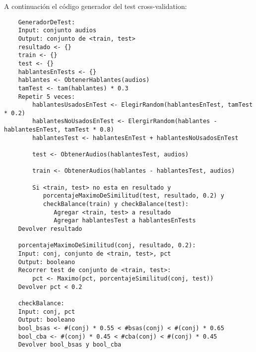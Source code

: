 A continuación el código generador del test cross-validation:
\begin{lstlisting}
    GeneradorDeTest:
    Input: conjunto audios
    Output: conjunto de <train, test>
    resultado <- {} 
    train <- {}
    test <- {}
    hablantesEnTests <- {}
    hablantes <- ObtenerHablantes(audios)
    tamTest <- tam(hablantes) * 0.3
    Repetir 5 veces:
        hablantesUsadosEnTest <- ElegirRandom(hablantesEnTest, tamTest * 0.2)
        hablantesNoUsadosEnTest <- ElergirRandom(hablantes - hablantesEnTest, tamTest * 0.8)
        hablantesTest <- hablantesEnTest + hablantesNoUsadosEnTest

        test <- ObtenerAudios(hablantesTest, audios)

        train <- ObtenerAudios(hablantes - hablantesTest, audios)

        Si <train, test> no esta en resultado y 
           porcentajeMaximoDeSimilitud(test, resultado, 0.2) y
           checkBalance(train) y checkBalance(test):
              Agregar <train, test> a resultado
              Agregar hablantesTest a hablantesEnTests
    Devolver resultado
    
    porcentajeMaximoDeSimilitud(conj, resultado, 0.2):
    Input: conj, conjunto de <train, test>, pct
    Output: booleano
    Recorrer test de conjunto de <train, test>:
    	pct <- Maximo(pct, porcentajeSimilitud(conj, test))
    Devolver pct < 0.2	

    checkBalance:
    Input: conj, pct
    Output: booleano
    bool_bsas <- #(conj) * 0.55 < #bsas(conj) < #(conj) * 0.65
    bool_cba <- #(conj) * 0.45 < #cba(conj) < #(conj) * 0.45
    Devolver bool_bsas y bool_cba
\end{lstlisting}

